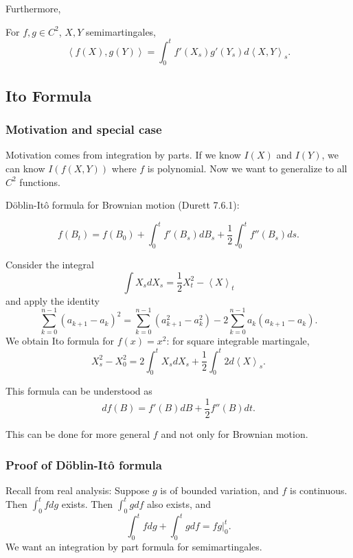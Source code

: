 Furthermore,
\begin{lemma}
	For $f, g \in C^2$, $X, Y$ semimartingales,
	\[
		\left\langle f(X), g(Y) \right\rangle 
		= \int _0^t f'(X_s) g'(Y_s) d \left\langle X, Y \right\rangle _s
	.\]
\end{lemma}

\subsection{Ito Formula}

\subsubsection{Motivation and special case}

Motivation comes from integration by parts. If we know $I(X)$ and $I(Y)$, we can know $I(f(X,Y))$ where $f$ is polynomial. Now we want to generalize to all $C^2$ functions.

D\"oblin-Itô formula for Brownian motion (Durett 7.6.1):

\[
	f(B_t) = f(B_0) + \int _0^t f'(B_s) d B_s + \frac{1}{2} \int _0^t f''(B_s) d s
.\] 

Consider the integral
\[
	\int X_s d X_s = \frac{1}{2} X_t^2 - \left\langle X \right\rangle _t
\] 
and apply the identity
\[
	\sum_{k=0}^{n-1} (a_{k+1} - a_k)^2
	=
\sum_{k=0}^{n-1} (a_{k+1}^2 - a_{k}^2) 
- 2 \sum_{k=0}^{n-1} a_k (a_{k+1} - a_k)
.\] 
We obtain Ito formula for $f(x) = x^2$:
for square integrable martingale,
		\[
			X_s^2 - X_0^2 = 2 \int_{0}^t X_s d X_s + \frac{1}{2} \int _0^t 2 d\left\langle X \right\rangle _s
		.\] 

This formula can be understood as
\[
	d f(B) = f'(B) d B + \frac{1}{2} f'' (B) d t
.\] 

This can be done for more general $f$ and not only for Brownian motion. 

\subsubsection{Proof of D\"oblin-Itô formula}

Recall from real analysis: 
	Suppose $g$ is of bounded variation, and $f$ is continuous. Then $\int _0^t f d g $ exists. Then $\int _0^t g df $ also exists, and 
	\[
		\int _0^t f dg + \int _0^t g df = fg |_0^t
	.\] 
We want an integration by part formula for semimartingales.


